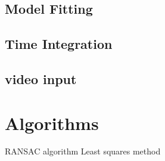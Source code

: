 \subsection{Model Fitting}

\subsection{Time Integration}

\subsection{video input}

\section{Algorithms}
RANSAC algorithm
Least squares method
